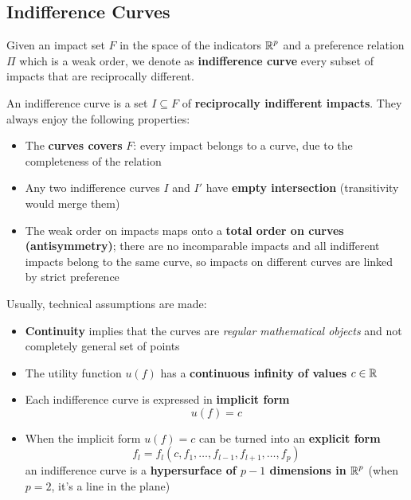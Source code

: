 \subsection{Indifference Curves}
\label{subsec:indifferencecurves}

\begin{definition}
	Given an impact set $F$ in the space of the indicators $\operatorname{\mathbb{R}}^p$ and a preference relation $\Pi$ which is a weak order, we denote as \textbf{indifference curve} every subset of impacts that are reciprocally different.
\end{definition}

An indifference curve is a set $I \subseteq F$ of \textbf{reciprocally indifferent impacts}. They always enjoy the following properties: 
\begin{itemize}
	\item The \textbf{curves covers} $F$: every impact belongs to a curve, due to the completeness of the relation
	
	\item Any two indifference curves $I$ and $I'$ have \textbf{empty intersection} (transitivity would merge them)
	
	\item The weak order on impacts maps onto a \textbf{total order on curves (antisymmetry)}; there are no incomparable impacts and all indifferent impacts belong to the same curve, so impacts on different curves are linked by strict preference
\end{itemize}

Usually, technical assumptions are made:
\begin{itemize}
	\item \textbf{Continuity} implies that the curves are \textit{regular mathematical objects} and not completely general set of points
	
	\item The utility function $u(f)$ has a \textbf{continuous infinity of values} $c \in \operatorname{\mathbb{R}}$ 
	
	\item Each indifference curve is expressed in \textbf{implicit form}
	$$ u(f) = c $$
	
	\item When the implicit form $u(f) = c$ can be turned into an \textbf{explicit form}
	$$ f_l = f_l \left(c, f_1, \dots, f_{l-1}, f_{l+1}, \dots , f_p\right) $$
	an indifference curve is a \textbf{hypersurface of $p-1$ dimensions in $\operatorname{\mathbb{R}}^p$} (when $p = 2$, it's a line in the plane)
\end{itemize}

